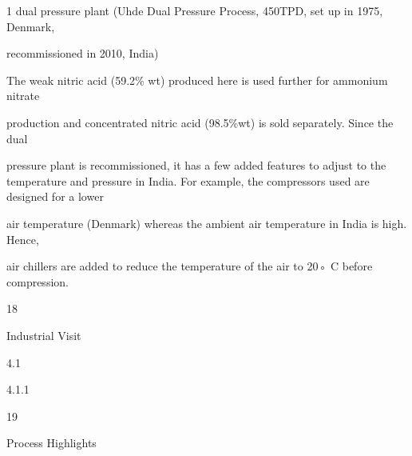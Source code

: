 \documentclass[a4paper,portrait,12pt]{article}
\begin{document}
\begin{flushleft}
1 dual pressure plant (Uhde Dual Pressure Process, 450TPD, set up in 1975, Denmark,
\end{flushleft}


\begin{flushleft}
recommissioned in 2010, India)
\end{flushleft}





\begin{flushleft}
The weak nitric acid (59.2\% wt) produced here is used further for ammonium nitrate
\end{flushleft}


\begin{flushleft}
production and concentrated nitric acid (98.5\%wt) is sold separately. Since the dual
\end{flushleft}


\begin{flushleft}
pressure plant is recommissioned, it has a few added features to adjust to the temperature and pressure in India. For example, the compressors used are designed for a lower
\end{flushleft}


\begin{flushleft}
air temperature (Denmark) whereas the ambient air temperature in India is high. Hence,
\end{flushleft}


\begin{flushleft}
air chillers are added to reduce the temperature of the air to 20◦ C before compression.
\end{flushleft}





18





\begin{flushleft}
\newpage
Industrial Visit
\end{flushleft}





4.1


4.1.1





19





\begin{flushleft}
Process Highlights
\end{flushleft}
\end{document}
